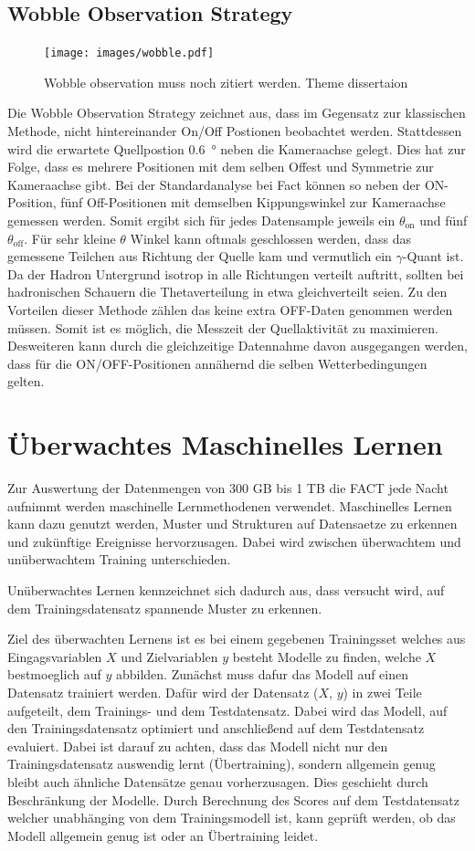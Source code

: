 \section{Wobble Observation Strategy}
\begin{figure}
  \texttt{[image: images/wobble.pdf]}
  \caption{Wobble observation muss noch zitiert werden. Theme dissertaion}
\end{figure}
Die Wobble Observation Strategy zeichnet aus, dass im Gegensatz zur klassischen Methode, nicht hintereinander On/Off Postionen beobachtet werden. 
Stattdessen wird die erwartete Quellpostion \SI{0.6}{\degree} neben die Kameraachse gelegt. 
Dies hat zur Folge, dass es mehrere Positionen mit dem selben Offest und Symmetrie zur Kameraachse gibt. 
Bei der Standardanalyse bei Fact können so neben der ON-Position, fünf Off-Positionen mit demselben Kippungswinkel zur Kameraachse gemessen werden. 
Somit ergibt sich für jedes Datensample jeweils ein $\theta_\text{on}$ und fünf $\theta_\text{off}$. 
Für sehr kleine $\theta$ Winkel kann oftmals geschlossen werden, dass das gemessene Teilchen aus Richtung der Quelle kam und vermutlich ein $\gamma$-Quant ist. 
Da der Hadron Untergrund isotrop in alle Richtungen verteilt auftritt, sollten bei hadronischen Schauern die Thetaverteilung in etwa gleichverteilt seien. 
Zu den Vorteilen dieser Methode zählen das keine extra OFF-Daten genommen werden müssen. 
Somit ist es möglich, die Messzeit der Quellaktivität zu maximieren. 
Desweiteren kann durch die gleichzeitige Datennahme davon ausgegangen werden, dass für die ON/OFF-Positionen annähernd die selben Wetterbedingungen gelten. 

\chapter{Überwachtes Maschinelles Lernen}
Zur Auswertung der Datenmengen von 300 GB bis 1 TB \cite{MaxNoethe} die FACT jede Nacht aufnimmt werden maschinelle Lernmethodenen verwendet. 
Maschinelles Lernen kann dazu genutzt werden, Muster und Strukturen auf Datensaetze zu erkennen und zukünftige Ereignisse hervorzusagen. 
Dabei wird zwischen überwachtem und unüberwachtem Training unterschieden.

Unüberwachtes Lernen kennzeichnet sich dadurch aus, dass versucht wird, auf dem Trainingsdatensatz spannende Muster zu erkennen.  

Ziel des überwachten Lernens ist es bei einem gegebenen Trainingsset welches aus Eingagsvariablen $X$ und Zielvariablen $y$ besteht Modelle zu finden, welche $X$ bestmoeglich auf $y$ abbilden. 
Zunächst muss dafur das Modell auf einen Datensatz trainiert werden. 
Dafür wird der Datensatz ($X$, $y$) in zwei Teile aufgeteilt, dem Trainings- und dem Testdatensatz. 
Dabei wird das Modell, auf den Trainingsdatensatz optimiert und anschließend auf dem Testdatensatz evaluiert. 
Dabei ist darauf zu achten, dass das Modell nicht nur den Trainingsdatensatz auswendig lernt (Übertraining), sondern allgemein genug bleibt auch ähnliche Datensätze genau vorherzusagen. 
Dies geschieht durch Beschränkung der Modelle. 
Durch Berechnung des Scores auf dem Testdatensatz welcher unabhänging von dem Trainingsmodell ist, kann geprüft werden, ob das Modell allgemein genug ist oder an Übertraining leidet.
